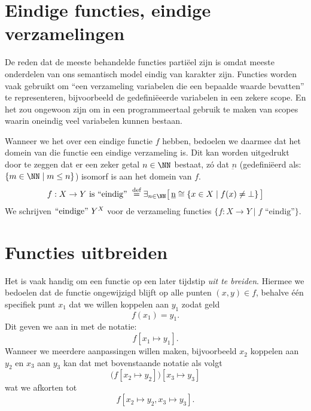 \section{Eindige functies, eindige verzamelingen}

De reden dat de meeste behandelde functies partiëel%
zijn is omdat meeste onderdelen van ons semantisch model eindig van karakter zijn. Functies worden vaak gebruikt om ``een verzameling variabelen die een bepaalde waarde bevatten'' te representeren, bijvoorbeeld de gedefiniëeerde%
variabelen in een zekere scope. En%
het zou ongewoon zijn om in een programmeertaal gebruik te maken van scopes waarin oneindig veel variabelen kunnen bestaan.

Wanneer we het over een eindige functie $f$ hebben, bedoelen we daarmee dat het domein van die functie een eindige verzameling is. Dit kan worden uitgedrukt door te zeggen dat er een zeker getal $n \in \NN$ bestaat, zó dat $\underbar{n}$ (gedefiniëerd als: $\{m \in \NN \mid m \le n\}$)%
isomorf%
is aan het domein van $f$.
\begin{align*}
f : X \to Y \text{ is ``eindig'' } \DEF \exists_{n \in \NN} \surr{ \underbar{n} \cong \{ x \in X \mid f(x) \neq \bot \} }
\end{align*}
We schrijven $\text{``eindige''~}{Y}^{X}$ voor de verzameling functies $\{f : X \to Y \mid f \text{ ``eindig''} \}$.

\section{Functies uitbreiden}

Het is vaak handig om een functie op een later tijdstip \emph{uit te breiden}. Hiermee we bedoelen dat de functie ongewijzigd blijft op alle punten $(x,y) \in f$, behalve één specifiek punt $x_1$ dat we willen koppelen aan $y_1$ zodat geld
\begin{equation*}
f(x_1) = y_1.
\end{equation*}
Dit geven we aan in met de notatie:
\begin{equation*}
f[x_1 \mapsto y_1].
\end{equation*}
Wanneer we meerdere aanpassingen willen maken, bijvoorbeeld $x_2$ koppelen aan $y_2$ en $x_3$ aan $y_3$ kan dat met bovenstaande notatie als volgt
\begin{equation*}
\big(f[x_2 \mapsto y_2]\big)[x_3 \mapsto y_3]
\end{equation*}
wat we afkorten tot
\begin{equation*}
f[x_2 \mapsto y_2, x_3 \mapsto y_3].
\end{equation*}

